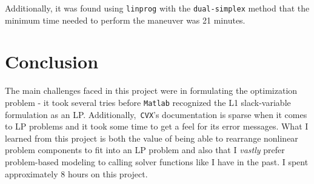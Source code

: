 \documentclass{article}
\begin{document}
Additionally, it was found using \texttt{linprog} with the \texttt{dual-simplex} method that the minimum time needed to perform the maneuver was 21 minutes.

\section*{Conclusion}

The main challenges faced in this project were in formulating the optimization problem - it took several tries before \texttt{Matlab} recognized the L1 slack-variable formulation as an LP.
Additionally,\texttt{ CVX}'s documentation is sparse when it comes to LP problems and it took some time to get a feel for its error messages.
What I learned from this project is both the value of being able to rearrange nonlinear problem components to fit into an LP problem and also that I \textit{vastly} prefer problem-based modeling to calling solver functions like I have in the past.
I spent approximately 8 hours on this project.
\end{document}
